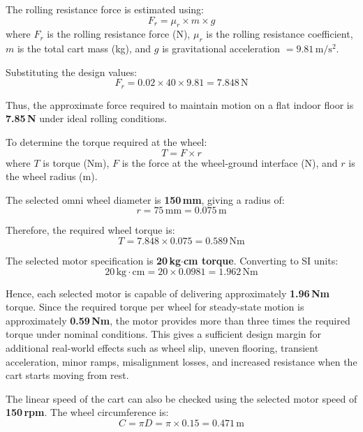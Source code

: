 The rolling resistance force is estimated using:
\begin{equation}
  F_r = \mu_r \times m \times g
\end{equation}
where $F_r$ is the rolling resistance force (N), $\mu_r$ is the rolling
resistance coefficient, $m$ is the total cart mass (kg), and $g$ is
gravitational acceleration $= 9.81\,\mathrm{m/s^2}$.

Substituting the design values:
\begin{equation}
  F_r = 0.02 \times 40 \times 9.81 = 7.848\,\mathrm{N}
\end{equation}

Thus, the approximate force required to maintain motion on a flat indoor
floor is \textbf{7.85\,N} under ideal rolling conditions.

To determine the torque required at the wheel:
\begin{equation}
  T = F \times r
\end{equation}
where $T$ is torque (Nm), $F$ is the force at the wheel-ground interface
(N), and $r$ is the wheel radius (m).

The selected omni wheel diameter is \textbf{150\,mm}, giving a radius of:
\begin{equation}
  r = 75\,\mathrm{mm} = 0.075\,\mathrm{m}
\end{equation}

Therefore, the required wheel torque is:
\begin{equation}
  T = 7.848 \times 0.075 = 0.589\,\mathrm{Nm}
\end{equation}

The selected motor specification is \textbf{20\,kg$\cdot$cm torque}.
Converting to SI units:
\begin{equation}
  20\,\mathrm{kg{\cdot}cm} = 20 \times 0.0981 = 1.962\,\mathrm{Nm}
\end{equation}

Hence, each selected motor is capable of delivering approximately
\textbf{1.96\,Nm} torque. Since the required torque per wheel for
steady-state motion is approximately \textbf{0.59\,Nm}, the motor
provides more than three times the required torque under nominal
conditions. This gives a sufficient design margin for additional
real-world effects such as wheel slip, uneven flooring, transient
acceleration, minor ramps, misalignment losses, and increased resistance
when the cart starts moving from rest.

The linear speed of the cart can also be checked using the selected motor
speed of \textbf{150\,rpm}. The wheel circumference is:
\begin{equation}
  C = \pi D = \pi \times 0.15 = 0.471\,\mathrm{m}
\end{equation}

